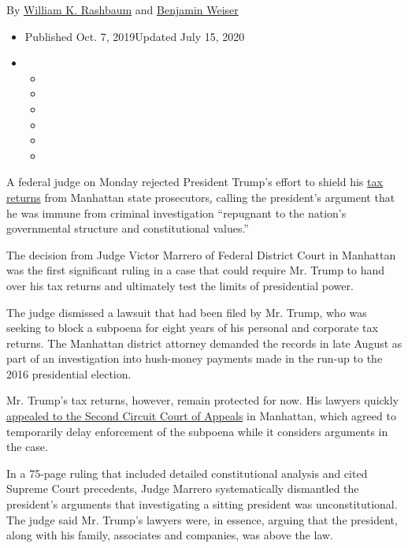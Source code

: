 By \href{https://www.nytimes.com/by/william-k-rashbaum}{William K.
Rashbaum} and \href{https://www.nytimes.com/by/benjamin-weiser}{Benjamin
Weiser}

\begin{itemize}
\item
  Published Oct. 7, 2019Updated July 15, 2020
\item
  \begin{itemize}
  \item
  \item
  \item
  \item
  \item
  \item
  \end{itemize}
\end{itemize}

A federal judge on Monday rejected President Trump's effort to shield
his
\href{https://www.nytimes.com/2020/07/15/nyregion/donald-trump-taxes-cyrus-vance.html}{tax
returns} from Manhattan state
prosecutors\href{https://www.nytimes.com/2019/09/19/nyregion/trump-tax-returns-lawsuit.html}{,}
calling the president's argument that he was immune from criminal
investigation ``repugnant to the nation's governmental structure and
constitutional values.''

The decision from Judge Victor Marrero of Federal District Court in
Manhattan was the first significant ruling in a case that could require
Mr. Trump to hand over his tax returns and ultimately test the limits of
presidential power.

The judge dismissed a lawsuit that had been filed by Mr. Trump, who was
seeking to block a subpoena for eight years of his personal and
corporate tax returns. The Manhattan district attorney demanded the
records in late August as part of an investigation into hush-money
payments made in the run-up to the 2016 presidential election.

Mr. Trump's tax returns, however, remain protected for now. His lawyers
quickly
\href{https://www.nytimes.com/2019/11/04/nyregion/trump-taxes-vance-appeal.html}{appealed
to the Second Circuit Court of Appeals} in Manhattan, which agreed to
temporarily delay enforcement of the subpoena while it considers
arguments in the case.

In a 75-page ruling that included detailed constitutional analysis and
cited Supreme Court precedents, Judge Marrero systematically dismantled
the president's arguments that investigating a sitting president was
unconstitutional. The judge said Mr. Trump's lawyers were, in essence,
arguing that the president, along with his family, associates and
companies, was above the law.

